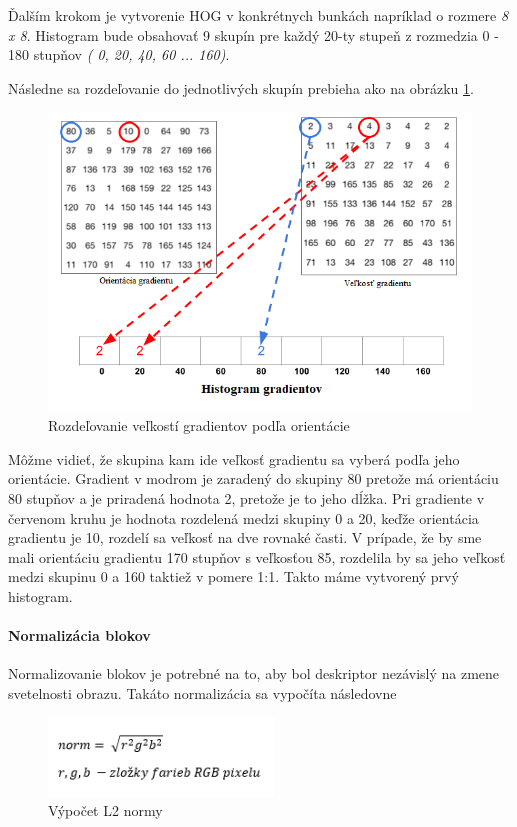 Ďalším krokom je vytvorenie HOG v konkrétnych bunkách napríklad o rozmere \textit{8 x 8}. Histogram bude obsahovať 9 skupín pre každý 20-ty stupeň z rozmedzia 0 - 180 stupňov \textit{( 0, 20, 40, 60 ... 160)}. 

Následne sa rozdeľovanie do jednotlivých skupín prebieha ako na obrázku \ref{HOGbins}. 

\begin{figure}[H]
  \centering
  \includegraphics[width=16cm]{img/HOGbins.png}
  \caption{Rozdeľovanie veľkostí gradientov podľa orientácie \cite{c20}}
  \label{HOGbins}
\end{figure}


Môžme vidieť, že skupina kam ide veľkosť gradientu sa vyberá podľa  jeho orientácie. Gradient v modrom je zaradený do skupiny 80 pretože má orientáciu 80 stupňov a je priradená hodnota 2, pretože je to jeho dĺžka. Pri gradiente v červenom kruhu je hodnota rozdelená medzi skupiny 0 a 20, keďže orientácia gradientu je 10, rozdelí sa veľkosť na dve rovnaké časti. V prípade, že by sme mali orientáciu gradientu 170 stupňov s veľkosťou 85, rozdelila by sa jeho veľkosť medzi skupinu 0 a 160 taktiež v pomere 1:1.
Takto máme vytvorený prvý histogram.



\paragraph{Normalizácia blokov}
Normalizovanie blokov je potrebné na to, aby bol deskriptor nezávislý na zmene svetelnosti obrazu. Takáto normalizácia sa vypočíta následovne

\begin{figure}[H]
  \centering
  \includegraphics[width=6cm]{img/HOGL2.png}
  \caption{Výpočet L2 normy\cite{c20}}
  \label{HOGL2}
\end{figure}

